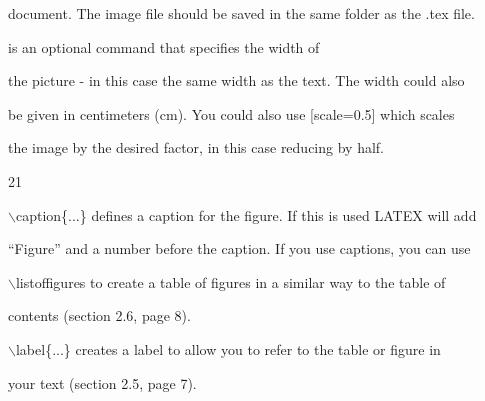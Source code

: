 \documentclass[a4paper,portrait,12pt]{article}
\begin{document}
\begin{flushleft}
document. The image file should be saved in the same folder as the .tex file.
\end{flushleft}


\begin{flushleft}
[width=1\ensuremath{\backslash}textwidth] is an optional command that specifies the width of
\end{flushleft}


\begin{flushleft}
the picture - in this case the same width as the text. The width could also
\end{flushleft}


\begin{flushleft}
be given in centimeters (cm). You could also use [scale=0.5] which scales
\end{flushleft}


\begin{flushleft}
the image by the desired factor, in this case reducing by half.
\end{flushleft}


21





\begin{flushleft}
\newpage
\ensuremath{\backslash}caption\{...\} defines a caption for the figure. If this is used LATEX will add
\end{flushleft}


\begin{flushleft}
{``}Figure'' and a number before the caption. If you use captions, you can use
\end{flushleft}


\begin{flushleft}
\ensuremath{\backslash}listoffigures to create a table of figures in a similar way to the table of
\end{flushleft}


\begin{flushleft}
contents (section 2.6, page 8).
\end{flushleft}


\begin{flushleft}
\ensuremath{\backslash}label\{...\} creates a label to allow you to refer to the table or figure in
\end{flushleft}


\begin{flushleft}
your text (section 2.5, page 7).
\end{flushleft}
\end{document}
